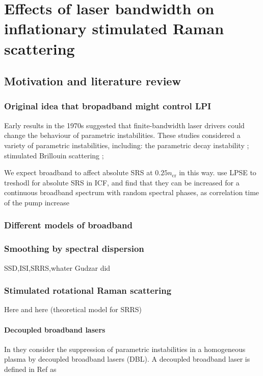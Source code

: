 \chapter{Effects of laser bandwidth on inflationary stimulated Raman scattering}
\label{chp:broadbandSRS}

\section{Motivation and literature review}

\subsection{Original idea that bropadband might control LPI}
Early results in the 1970s suggested that finite-bandwidth laser drivers could change the behaviour of parametric instabilities. These studies considered a variety of parametric instabilities, including: the parametric decay instability \citep{Thomson1974}; stimulated Brillouin scattering \citep{Kruer1973};  


We expect broadband to affect absolute SRS at $0.25n_{\text{cr}}$ in this way. \citet{Follet_2019} use LPSE to treshodl for absolute SRS in ICF, and find that they can be increased for a continuous broadband spectrum with random spectral phases, as correlation time of the pump increase

\subsection{Different models of broadband}
\subsection{Smoothing by spectral dispersion}

SSD,ISI,SRRS,whater Gudzar did

\subsection{Stimulated rotational Raman scattering}
Here \citep{Eimerl1993} and here \citep{Weaver2017} (theoretical model for SRRS)

\subsubsection{Decoupled broadband lasers}
In \cite{zhao_suppression_2019} they consider the suppression of parametric
instabilities in a homogeneous plasma by decoupled broadband lasers
(\acrshort{DBL}). A
decoupled broadband laser is defined in Ref \cite{zhao_effective_2017} as


